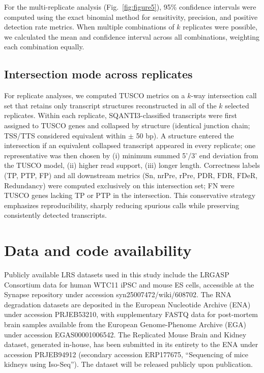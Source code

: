 \documentclass[pdflatex,sn-nature]{sn-jnl}%
\begin{document}
For the multi-replicate analysis (Fig.~\ref{fig:figure5}), 95\% confidence intervals were computed using the exact binomial method for sensitivity, precision, and positive detection rate metrics. When multiple combinations of $k$ replicates were possible, we calculated the mean and confidence interval across all combinations, weighting each combination equally.

\subsection{Intersection mode across replicates}

For replicate analyses, we computed TUSCO metrics on a $k$-way intersection call set that retains only transcript structures reconstructed in all of the $k$ selected replicates. Within each replicate, SQANTI3-classified transcripts were first assigned to TUSCO genes and collapsed by structure (identical junction chain; TSS/TTS considered equivalent within $\pm$ 50 bp). A structure entered the intersection if an equivalent collapsed transcript appeared in every replicate; one representative was then chosen by (i) minimum summed 5'/3' end deviation from the TUSCO model, (ii) higher read support, (iii) longer length. Correctness labels (TP, PTP, FP) and all downstream metrics ($\mathrm{Sn}$, $\mathrm{nrPre}$, $\mathrm{rPre}$, $\mathrm{PDR}$, $\mathrm{FDR}$, $\mathrm{FDeR}$, $\mathrm{Redundancy}$) were computed exclusively on this intersection set; FN were TUSCO genes lacking TP or PTP in the intersection. This conservative strategy emphasizes reproducibility, sharply reducing spurious calls while preserving consistently detected transcripts.


\section{Data and code availability}

Publicly available LRS datasets used in this study include the LRGASP Consortium data for human WTC11 iPSC and mouse ES cells, accessible at the Synapse repository under accession syn25007472/wiki/608702. The RNA degradation datasets are deposited in the European Nucleotide Archive (ENA) under accession PRJEB53210, with supplementary FASTQ data for post-mortem brain samples available from the European Genome-Phenome Archive (EGA) under accession EGAS00001006542. The Replicated Mouse Brain and Kidney dataset, generated in-house, has been submitted in its entirety to the ENA under accession PRJEB94912 (secondary accession ERP177675, ``Sequencing of mice kidneys using Iso-Seq''). The dataset will be released publicly upon publication.
\end{document}
